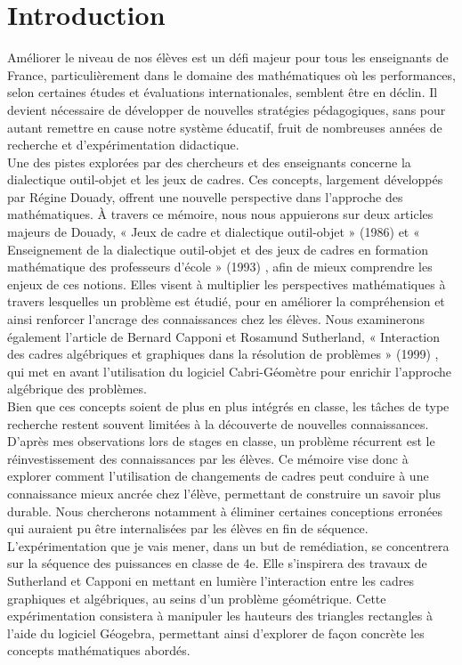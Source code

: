 \section*{Introduction}

Améliorer le niveau de nos élèves est un défi majeur pour tous les enseignants de France,
particulièrement dans le domaine des mathématiques où les performances,
selon certaines études et évaluations internationales,
semblent être en déclin.
Il devient nécessaire de développer de nouvelles stratégies pédagogiques,
sans pour autant remettre en cause notre système éducatif,
fruit de nombreuses années de recherche et d'expérimentation didactique.\\

Une des pistes explorées par des chercheurs et des enseignants concerne la dialectique outil-objet et les jeux de cadres.
Ces concepts,
largement développés par Régine Douady,
offrent une nouvelle perspective dans l'approche des mathématiques.
À travers ce mémoire, nous nous appuierons sur deux articles majeurs de Douady,
« Jeux de cadre et dialectique outil-objet » (1986) \cite{douady1} et « Enseignement de la dialectique outil-objet et des jeux de cadres en formation mathématique des professeurs d'école » (1993) \cite{douady2},
afin de mieux comprendre les enjeux de ces notions.
Elles visent à multiplier les perspectives mathématiques à travers lesquelles un problème est étudié,
pour en améliorer la compréhension et ainsi renforcer l'ancrage des connaissances chez les élèves.
Nous examinerons également l'article de Bernard Capponi et Rosamund Sutherland,
« Interaction des cadres algébriques et graphiques dans la résolution de problèmes » (1999) \cite{capponi},
qui met en avant l'utilisation du logiciel Cabri-Géomètre pour enrichir l'approche algébrique des problèmes.\\

Bien que ces concepts soient de plus en plus intégrés en classe,
les tâches de type recherche restent souvent limitées à la découverte de nouvelles connaissances.
D'après mes observations lors de stages en classe,
un problème récurrent est le réinvestissement des connaissances par les élèves.
Ce mémoire vise donc à explorer comment l'utilisation de changements de cadres peut conduire à une connaissance mieux ancrée chez l'élève,
permettant de construire un savoir plus durable.
Nous chercherons notamment à éliminer certaines conceptions erronées qui auraient pu être internalisées par les élèves en fin de séquence.\\

L'expérimentation que je vais mener,
dans un but de remédiation,
se concentrera sur la séquence des puissances en classe de 4e.
Elle s'inspirera des travaux de Sutherland et Capponi en mettant en lumière l'interaction entre les cadres graphiques et algébriques,
au seins d'un problème géométrique.
Cette expérimentation consistera à manipuler les hauteurs des triangles rectangles à l'aide du logiciel Géogebra,
permettant ainsi d'explorer de façon concrète les concepts mathématiques abordés.